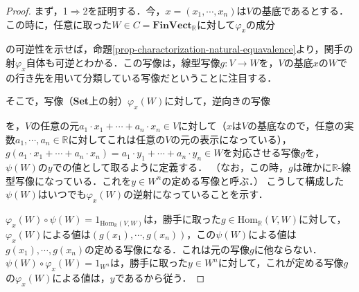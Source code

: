 \documentclass[uplatex, 12pt, dvipdfmx]{jsreport}
\begin{document}
\begin{proof}
    まず，1$\Rightarrow$2を証明する．今，$x=(x_1,\cdots,x_n)$は$V$の基底であるとする．この時に，任意に取った$W\in C=\mathbf{FinVect}_\mathbb{R}$に対して$\varphi_x$の成分
    \begin{center}\end{center}
    の可逆性を示せば，命題\ref{prop-charactorization-natural-equavalence}より，関手の射$\varphi_x$自体も可逆とわかる．この写像は，線型写像$g:V\to W$を，$V$の基底$x$の$W$での行き先を用いて分類している写像だということに注目する．

    そこで，写像（\textbf{Set}上の射）$\varphi_x(W)$に対して，逆向きの写像
    \begin{center}\end{center}
    を，$V$の任意の元$a_1\cdot x_1+\cdots +a_n\cdot x_n\in V$に対して（$x$は$V$の基底なので，任意の実数$a_1,\cdots,a_n\in\mathbb{R}$に対してこれは任意の$V$の元の表示になっている），$g(a_1\cdot x_1+\cdots +a_n\cdot x_n)=a_1\cdot y_1+\cdots +a_n\cdot y_n\in W$を対応させる写像$g$を，$\psi(W)$の$y$での値として取るように定義する．
    （なお，この時，$g$は確かに$\mathbb{R}$-線型写像になっている．これを$y\in W^n$の定める写像と呼ぶ．）
    こうして構成した$\psi(W)$はいつでも$\varphi_x(W)$の逆射になっていることを示す．

    $\varphi_x(W)\circ \psi(W)=1_{\mathrm{Hom}_\mathbb{R}(V,W)}$は，勝手に取った$g\in\mathrm{Hom}_\mathbb{R}(V,W)$に対して，$\varphi_x(W)$による値は$\left( g(x_1),\cdots,g(x_n) \right)$，この$\psi(W)$による値は$g(x_1),\cdots,g(x_n)$の定める写像になる．これは元の写像$g$に他ならない．
    $\psi(W)\circ \varphi_x(W)=1_{W^n}$は，勝手に取った$y\in W^n$に対して，これが定める写像$g$の$\varphi_x(W)$による値は，$y$であるから従う．


\end{proof}
\end{document}
